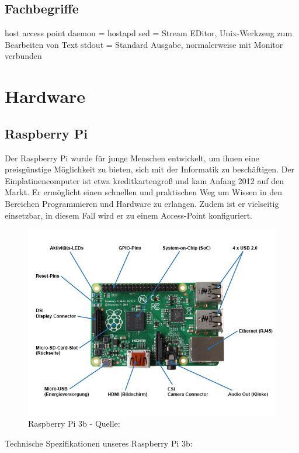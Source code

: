 \documentclass[a4paper,11pt,singlespacing]{article}
\begin{document}
    	\subsection{Fachbegriffe}
    	host access point daemon = hostapd
    	sed = Stream EDitor, Unix-Werkzeug zum Bearbeiten von Text
    	stdout = Standard Ausgabe, normalerweise mit Monitor verbunden
    	
      	\section{Hardware}
    		\subsection{Raspberry Pi}
    			Der Raspberry Pi wurde für junge Menschen entwickelt, um ihnen eine preisgünstige Möglichkeit zu bieten, sich mit der Informatik zu beschäftigen. Der Einplatinencomputer ist etwa kreditkartengroß und kam Anfang 2012 auf den Markt. Er ermöglicht einen schnellen und praktischen Weg um Wissen in den Bereichen Programmieren und Hardware zu erlangen. Zudem ist er vielseitig einsetzbar, in diesem Fall wird er zu einem Access-Point konfiguriert. 
    			\begin{figure}[H]
    				\centering
	    			\includegraphics[scale=0.5]{raspberry_pi_3b}
	    				\caption{Raspberry Pi 3b - Quelle: \cite{Picture_Raspberrypi3b} }
	    				\label{raspberrypi3b}
				\end{figure}
				Technische Spezifikationen unseres Raspberry Pi 3b:
\end{document}
